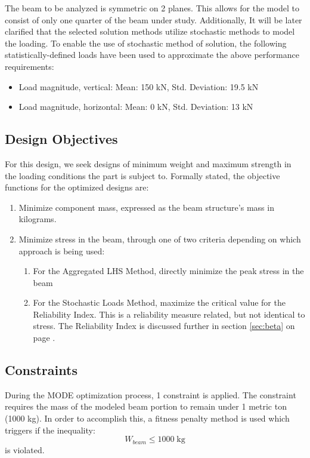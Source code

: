 The beam to be analyzed is symmetric on 2 planes. This allows for the model to consist of only one quarter of the beam under study. Additionally, It will be later clarified that the selected solution methods utilize stochastic methods to model the loading. To enable the use of stochastic method of solution, the following statistically-defined loads have been used to approximate the above performance requirements: 

\begin{itemize}
\item Load magnitude, vertical:   Mean: 150 kN, Std. Deviation: 19.5 kN
\item Load magnitude, horizontal: Mean: 0   kN, Std. Deviation: 13 kN
\end{itemize}

\subsection{Design Objectives}
For this design, we seek designs of minimum weight and maximum strength in the loading conditions the part is subject to. Formally stated, the objective functions for the optimized designs are: 

\begin{enumerate}
\item Minimize component mass, expressed as the beam structure's mass in kilograms. 
\item Minimize stress in the beam, through one of two criteria depending on which approach is being used: 
	\begin{enumerate}
	    \item For the Aggregated LHS Method, directly minimize the peak stress in the beam
	    \item For the Stochastic Loads Method, maximize the critical value for the Reliability Index. This is a reliability measure related, but not identical to stress. The Reliability Index is discussed further in section \ref{sec:beta} on page \pageref{sec:beta}.
	\end{enumerate}
\end{enumerate}

\subsection{Constraints}
During the MODE optimization process, 1 constraint is applied. The constraint requires the mass of the modeled beam portion to remain under 1 metric ton (1000 kg). In order to accomplish this, a fitness penalty method is used which triggers if the inequality:
$$
W_{beam} \leq 1000 \; \text{kg}
$$
is violated. 

